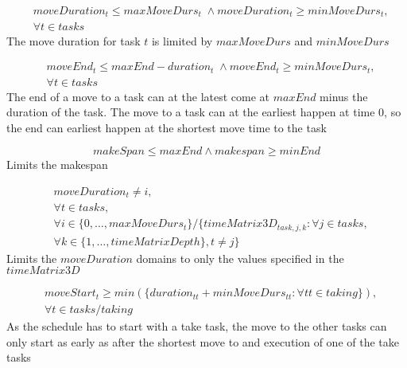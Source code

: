 \documentclass[10pt,a4paper]{report}
\begin{document}
\begin{equation}
\begin{aligned}\label{eq:64}
&moveDuration_t \le maxMoveDurs_t \; \land moveDuration_t \ge minMoveDurs_t, \\
&\forall t \in tasks
\end{aligned}
\end{equation}
The move duration for task $t$ is limited by $maxMoveDurs$ and $minMoveDurs$

\begin{equation}
\begin{aligned}\label{eq:65}
&moveEnd_t \le maxEnd - duration_t \; \land moveEnd_t \ge minMoveDurs_t, \\
&\forall t \in tasks
\end{aligned}
\end{equation}
The end of a move to a task can at the latest come at $maxEnd$ minus the duration of the task. The move to a task can at the earliest happen at time 0, so the end can earliest happen at the shortest move time to the task

\begin{equation}\label{eq:66}
makeSpan \le maxEnd \land makespan \ge minEnd\end{equation}
Limits the makespan

\begin{equation}
\begin{aligned}\label{eq:67}
&moveDuration_t \neq i, \\
&\forall t \in tasks,  \\
&\forall i \in \{0 , \ldots , maxMoveDurs_t\} / \{timeMatrix3D_{task,j,k} : \forall j \in tasks, \\
&\forall k \in \{1 , \ldots , timeMatrixDepth\}, t \neq j\}
\end{aligned}
\end{equation}
Limits the $moveDuration$ domains to only the values specified in the $timeMatrix3D$

\begin{equation}
\begin{aligned}\label{eq:69}
&moveStart_t \ge min(\{duration_{tt} + minMoveDurs_{tt} : \forall tt \in taking\}),\\
&\forall t \in tasks / taking\end{aligned}
\end{equation}
As the schedule has to start with a take task, the move to the other tasks can only start as early as after the shortest move to and execution of one of the take tasks
\end{document}
